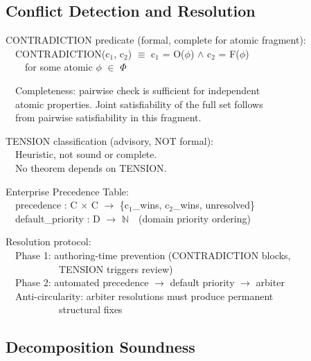 \subsection{Conflict Detection and Resolution}
\label{sec:formal-model-A-1-8}


\begin{claddisp}
CONTRADICTION predicate (formal, complete for atomic fragment):\\
~~CONTRADICTION(c$_1$, c$_2$) $\equiv$ c$_1$ = O($\phi$) $\wedge$ c$_2$ = F($\phi$)\\
~~~~for some atomic $\phi$ $\in$ $\Phi$
\par\smallskip
~~Completeness: pairwise check is sufficient for independent\\
~~atomic properties. Joint satisfiability of the full set follows\\
~~from pairwise satisfiability in this fragment.
\par\smallskip
TENSION classification (advisory, NOT formal):\\
~~Heuristic, not sound or complete.\\
~~No theorem depends on TENSION.
\par\smallskip
Enterprise Precedence Table:\\
~~precedence : C $\times$ C $\to$ \{c$_1$\_wins, c$_2$\_wins, unresolved\}\\
~~default\_priority : D $\to$ $\mathbb{N}$~~(domain priority ordering)
\par\smallskip
Resolution protocol:\\
~~Phase 1: authoring-time prevention (CONTRADICTION blocks,\\
~~~~~~~~~~~TENSION triggers review)\\
~~Phase 2: automated precedence $\to$ default priority $\to$ arbiter\\
~~Anti-circularity: arbiter resolutions must produce permanent\\
~~~~~~~~~~~structural fixes
\end{claddisp}


\subsection{Decomposition Soundness}
\label{sec:formal-model-A-1-9}


